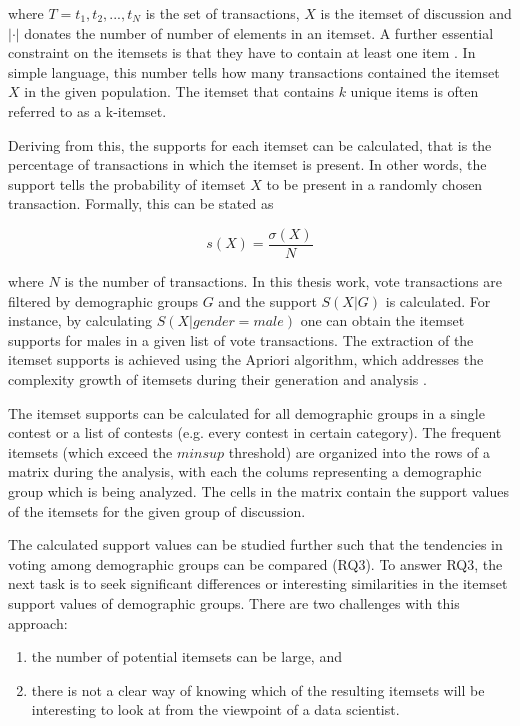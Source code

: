 where $T = {t_1, t_2, ..., t_N}$ is the set of transactions, $X$ is the itemset of discussion and $| \cdot |$ donates the number of number of elements in an itemset. A further essential constraint on the itemsets is that they have to contain at least one item \cite{introtodatamining}. In simple language, this number tells how many transactions contained the itemset $X$ in the given population. The itemset that contains $k$ unique items is often referred to as a k-itemset. 

Deriving from this, the supports for each itemset can be calculated, that is the percentage of transactions in which the itemset is present. In other words, the support tells the probability of itemset $X$ to be present in a randomly chosen transaction. Formally, this can be stated as 

\begin{equation}
    s(X) = \frac{\sigma (X)}{N}
\end{equation}

where $N$ is the number of transactions. In this thesis work, vote transactions are filtered by demographic groups $G$ and the support $S(X|G)$ is calculated. For instance, by calculating $S(X|gender = male)$ one can obtain the itemset supports for males in a given list of vote transactions. The extraction of the itemset supports is achieved using the Apriori algorithm, which addresses the complexity growth of itemsets during their generation and analysis \cite{introtodatamining}. 

The itemset supports can be calculated for all demographic groups in a single contest or a list of contests (e.g. every contest in certain category). The frequent itemsets (which exceed the $minsup$ threshold) are organized into the rows of a matrix during the analysis, with each the colums representing a demographic group which is being analyzed. The cells in the matrix contain the support values of the itemsets for the given group of discussion. 

The calculated support values can be studied further such that the tendencies in voting among demographic groups can be compared (RQ3). To answer RQ3, the next task is to seek significant differences or interesting similarities in the itemset support values of demographic groups. There are two challenges with this approach: 

\begin{enumerate}
    \item the number of potential itemsets can be large, and
    \item there is not a clear way of knowing which of the resulting itemsets will be interesting to look at from the viewpoint of a data scientist.
\end{enumerate} 

